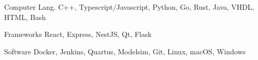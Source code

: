 

\begin{cvskills}

  \cvskill
    {Computer Lang.} %
    {C++, Typescript/Javascript, Python, Go, Rust, Java, VHDL, HTML, Bash} %

  \cvskill
    {Frameworks\phantom{aaa}} %
    {React, Express, NestJS, Qt, Flask} %

  \cvskill
    {Software\phantom{aaaaaa}} %
    {Docker, Jenkins, Quartus, Modelsim, Git, Linux, macOS, Windows} %


\end{cvskills}
